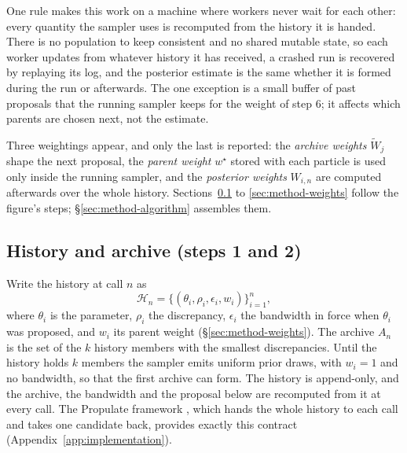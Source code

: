 \documentclass[10pt]{article}
\theoremstyle{plain}
\theoremstyle{definition}
\begin{document}
One rule makes this work on a machine where workers never wait for each other: every quantity the sampler uses is recomputed from the history it is handed. There is no population to keep consistent and no shared mutable state, so each worker updates from whatever history it has received, a crashed run is recovered by replaying its log, and the posterior estimate is the same whether it is formed during the run or afterwards. The one exception is a small buffer of past proposals that the running sampler keeps for the weight of step 6; it affects which parents are chosen next, not the estimate.

Three weightings appear, and only the last is reported: the \emph{archive weights} $\tilde W_j$ shape the next proposal, the \emph{parent weight} $w^\star$ stored with each particle is used only inside the running sampler, and the \emph{posterior weights} $W_{i,n}$ are computed afterwards over the whole history. Sections~\ref{sec:method-history} to \ref{sec:method-weights} follow the figure's steps; \S\ref{sec:method-algorithm} assembles them.

\subsection{History and archive (steps 1 and 2)}\label{sec:method-history}
Write the history at call $n$ as
\begin{equation}
\mathcal{H}_n = \bigl\{(\theta_i,\rho_i,\epsilon_i,w_i)\bigr\}_{i=1}^{n},
\label{eq:history}
\end{equation}
where $\theta_i$ is the parameter, $\rho_i$ the discrepancy, $\epsilon_i$ the bandwidth in force when $\theta_i$ was proposed, and $w_i$ its parent weight (\S\ref{sec:method-weights}). The archive $A_n$ is the set of the $k$ history members with the smallest discrepancies. Until the history holds $k$ members the sampler emits uniform prior draws, with $w_i=1$ and no bandwidth, so that the first archive can form. The history is append-only, and the archive, the bandwidth and the proposal below are recomputed from it at every call. The Propulate framework \citep{taubert2023propulate}, which hands the whole history to each call and takes one candidate back, provides exactly this contract (Appendix~\ref{app:implementation}).
\end{document}
